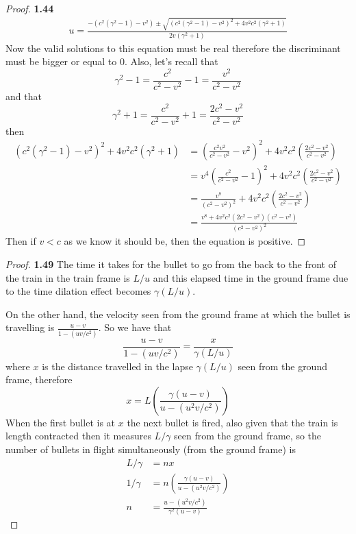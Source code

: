 \documentclass[11pt]{article}
\theoremstyle{definition}
\begin{document}
\begin{proof}{\textbf{1.44}}
\begin{align*}
            u = \frac{
                -(c^2(\gamma^2-1) - v^2) \pm \sqrt{(
                    c^2(\gamma^2-1) - v^2)^2 + 4v^2c^2(\gamma^2+1)
                }
            }{2v(\gamma^2+1)}
        \end{align*}
        Now the valid solutions to this equation must be real therefore the discriminant
        must be bigger or equal to 0. Also, let's recall that
        $$\gamma^2 - 1 = \frac{c^2}{c^2-v^2} -1 = \frac{v^2}{c^2-v^2}$$
        and that 
        $$\gamma^2 + 1 = \frac{c^2}{c^2-v^2} +1 = \frac{2c^2 - v^2}{c^2-v^2}$$
        then
        \begin{align*}
            (c^2(\gamma^2-1) - v^2)^2 + 4v^2c^2(\gamma^2+1) &=
                (\frac{c^2v^2}{c^2-v^2} - v^2)^2 + 4v^2c^2(\frac{2c^2 - v^2}{c^2-v^2})\\
                &= v^4(\frac{c^2}{c^2-v^2} - 1)^2 + 4v^2c^2(\frac{2c^2 - v^2}{c^2-v^2})\\
                &= \frac{v^8}{(c^2-v^2)^2} + 4v^2c^2(\frac{2c^2 - v^2}{c^2-v^2})\\
                &= \frac{v^8 + 4v^2c^2(2c^2 - v^2)(c^2-v^2)}{(c^2-v^2)^2}
        \end{align*}
        Then if $v<c$ as we know it should be, then the equation is positive.
    \end{proof}
    \begin{proof}{\textbf{1.49}}
        The time it takes for the bullet to go from the back to the front of the train
        in the train frame is $L/u$ and this elapsed time in the ground frame due to the
        time dilation effect becomes $\gamma(L/u)$.
        
        On the other hand, the velocity seen from the ground frame at which the bullet
        is travelling is $\frac{u-v}{1-(uv/c^2)}$. So we have that
        $$\frac{u-v}{1-(uv/c^2)} = \frac{x}{\gamma(L/u)}$$
        where $x$ is the distance travelled in the lapse $\gamma(L/u)$ seen from the
        ground frame, therefore
        $$x = L\left(\frac{\gamma(u-v)}{u-(u^2v/c^2)}\right)$$
        When the first bullet is at $x$ the next bullet is fired, also given that the
        train is length contracted then it measures $L/\gamma$ seen from the ground
        frame, so the number of bullets in flight simultaneously (from the ground frame)
        is 
        \begin{align*}
            L/\gamma &= nx\\
            1/\gamma &= n\left(\frac{\gamma(u-v)}{u-(u^2v/c^2)}\right)\\
            n &= \frac{u-(u^2v/c^2)}{\gamma^2(u-v)}             
        \end{align*}
    \end{proof}
\end{document}
